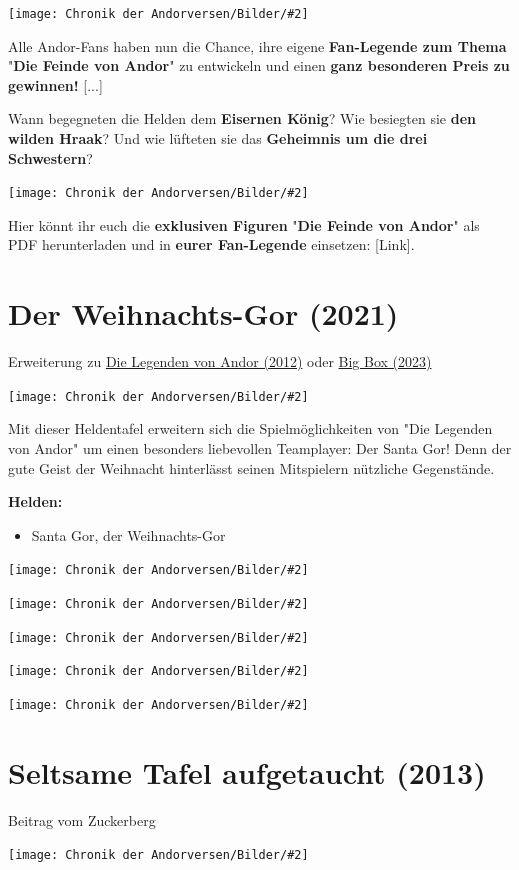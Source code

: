 \documentclass[10pt, a4paper, oneside]{book}
\newcommand{\fillbreak}{\vspace*{\fill}\columnbreak}
\newcommand{\produkt}[1]{%
    \section{#1}%
    \label{Produkt: #1}%
}
\newcommand{\storytext}[1]{%
    \section{#1}%
    \label{Storytext: #1}%
}
\newcommand{\refprodukt}[1]{\hyperref[Produkt: #1]{#1}}
\newcommand{\bildmitts}[2][height=0.32\textwidth,width=0.48\textwidth,keepaspectratio]{%
    \begin{center}
        \texttt{[image: Chronik der Andorversen/Bilder/\#2]}
    \end{center}
}
\begin{document}
\begin{multicols}{2}
\bildmitts{Die Feinde 1.jpeg}

Alle Andor-Fans haben nun die Chance, ihre eigene \textbf{Fan-Legende zum Thema} "\textbf{Die Feinde von Andor}" zu entwickeln und einen \textbf{ganz besonderen Preis zu gewinnen!} [...]

Wann begegneten die Helden dem \textbf{Eisernen König}? Wie besiegten sie \textbf{den wilden Hraak}? Und wie lüfteten sie das \textbf{Geheimnis um die drei Schwestern}?


\bildmitts{Die Feinde 2.jpeg}

Hier könnt ihr euch die \textbf{exklusiven Figuren} "\textbf{Die Feinde von Andor}" als PDF herunterladen und in \textbf{eurer Fan-Legende} einsetzen:
[Link].


\fillbreak

\produkt{Der Weihnachts-Gor (2021)}

\begin{center}
    Erweiterung zu \refprodukt{Die Legenden von Andor (2012)} oder \refprodukt{Big Box (2023)}
\end{center}

\bildmitts{Der Santa Gor.jpeg}

Mit dieser Heldentafel erweitern sich die Spielmöglichkeiten von "Die Legenden von Andor" um einen besonders liebevollen Teamplayer: Der Santa Gor! Denn der gute Geist der Weihnacht hinterlässt seinen Mitspielern nützliche Gegenstände.\bigskip 


\textbf{Helden:} 

\begin{itemize}[topsep=0pt,itemsep=-1ex,partopsep=1ex,parsep=1ex]
    \item Santa Gor, der Weihnachts-Gor
\end{itemize}


\bildmitts{Weihnachten 1.jpeg}

\bildmitts{Weihnachten 2.jpeg}

\bildmitts{Weihnachten 3.jpeg}

\bildmitts{Weihnachten 4.jpeg}

\bildmitts{Weihnachten 5.jpeg}





\fillbreak
\storytext{Seltsame Tafel aufgetaucht (2013)}

\begin{center}
    Beitrag vom Zuckerberg
\end{center}

\bildmitts{Seltsame Tafel Bild 1.jpg}


\end{multicols}
\end{document}
